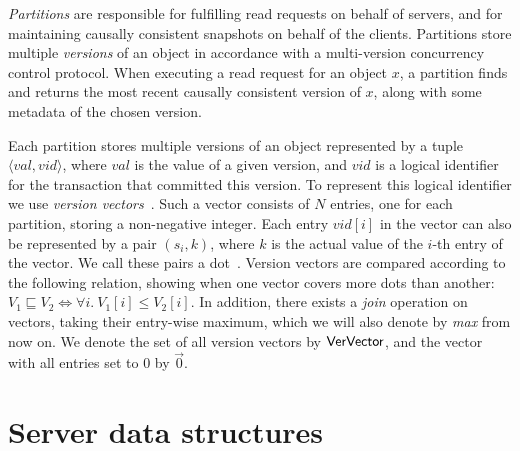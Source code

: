 \emph{Partitions} are responsible for fulfilling read requests on behalf of servers, and for maintaining causally consistent snapshots on behalf of the clients. Partitions store multiple \emph{versions} of an object in accordance with a multi-version concurrency control protocol. When executing a read request for an object $x$, a partition finds and returns the most recent causally consistent version of $x$, along with some metadata of the chosen version.

Each partition stores multiple versions of an object represented by a tuple $\langle val, vid \rangle$, where $val$ is the value of a given version, and $vid$ is a logical identifier for the transaction that committed this version. To represent this logical identifier we use \emph{version vectors}~\citep{version-vectors}. Such a vector consists of $N$ entries, one for each partition, storing a non-negative integer. Each entry $vid[i]$ in the vector can also be represented by a pair $(s_i, k)$, where $k$ is the actual value of the $i$-th entry of the vector. We call these pairs a dot~\citep{carlos-causality}. Version vectors are compared according to the following relation, showing when one vector covers more dots than another: $V_1 \sqsubseteq V_2 \iff \forall i.\ V_1[i] \le V_2[i]$. In addition, there exists a \emph{join} operation on vectors, taking their entry-wise maximum, which we will also denote by \emph{max} from now on. We denote the set of all version vectors by $\mathsf{VerVector}$, and the vector with all entries set to $0$ by $\vec{0}$.

\section{Server data structures}
\label{sect:protocol_structures}

